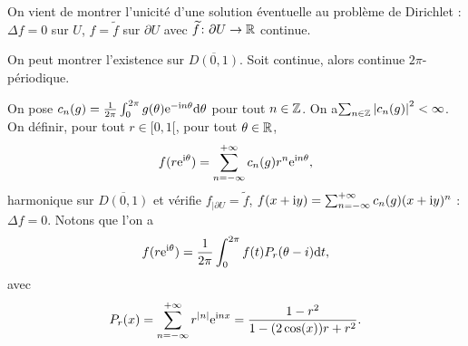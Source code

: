 \documentclass[12pt]{article}
\begin{document}
\begin{remark}
	On vient de montrer l'unicité d'une solution éventuelle au problème de Dirichlet : $\Delta f=0$ sur $U$, $f=\widetilde{f}$ sur $\partial U$ avec $\widetilde{f}\colon\partial U\to\mathbb{R}$ continue.

	On peut montrer l'existence sur $\overline{D(0,1)}$.
	Soit  continue, alors  continue $2\pi$-périodique.

	On pose $c_n(g)=\frac{1}{2\pi}\int_{0}^{2\pi}g(\theta)\mathrm{e}^{-\mathrm{i} n\theta}\mathrm{d}\theta$ pour tout $n\in\mathbb{Z}$. On a$ \sum_{n\in\mathbb{Z}}\left\lvert c_n(g)\right\rvert^{2}<\infty$. On définir, pour tout $r\in[0,1[$, pour tout $\theta\in\mathbb{R}$,
	\begin{equation}
		f(r\mathrm{e}^{\mathrm{i}\theta})=\sum_{n=-\infty}^{+\infty}c_n(g)r^{n}\mathrm{e}^{\mathrm{i} n\theta},
	\end{equation}
	harmonique sur $\overline{D(0,1)}$ et vérifie $f_{\mid\partial U}=\widetilde{f}$, $f(x+\mathrm{i} y)=\sum_{n=-\infty}^{+\infty}c_n(g)(x+\mathrm{i} y)^{n}$ : $\Delta f=0$. Notons que l'on a 
	\begin{equation}
		f(r\mathrm{e}^{\mathrm{i}\theta})=\frac{1}{2\pi}\int_{0}^{2\pi}f(t)P_r(\theta-i)\mathrm{d} t,
	\end{equation}
	avec 
	\begin{equation}
		P_r(x)=\sum_{n=-\infty}^{+\infty}r^{\left\lvert n\right\rvert}\mathrm{e}^{\mathrm{i} nx}=\frac{1-r^{2}}{1-(2\cos(x))r+r^{2}}.
	\end{equation}
\end{remark}
\end{document}
